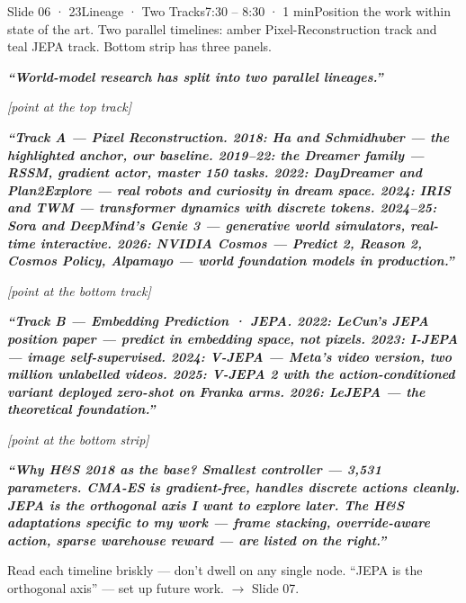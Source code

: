 \documentclass[11pt,a4paper]{article}
\newcommand{\say}[1]{%
    \par\vspace{0.3em}%
    \begingroup
    \leftskip=12pt
    \rightskip=8pt
    \color{thStrong}%
    \itshape\textbf{“#1”}%
    \par
    \endgroup
    \vspace{0.2em}
}
\newcommand{\stage}[1]{%
    \par\textcolor{thMuted}{\small\textit{[#1]}}\par
    \vspace{0.2em}
}
\newcommand{\emphw}[1]{\textbf{\textcolor{thAmber}{#1}}}
\newcommand{\emphteal}[1]{\textbf{\textcolor{thTeal}{#1}}}
\begin{document}
\begin{slide}{Slide 06 · 23}{Lineage · Two Tracks}{7:30 – 8:30 · 1 min}{Position the work within state of the art. Two parallel timelines: amber Pixel-Reconstruction track and teal JEPA track. Bottom strip has three panels.}
\say{World-model research has split into \textbf{two parallel lineages}.}

\stage{point at the top track}

\say{\emphw{Track A — Pixel Reconstruction.} \textbf{2018}: Ha and Schmidhuber — the highlighted anchor, our baseline. \textbf{2019–22}: the Dreamer family — RSSM, gradient actor, master 150 tasks. \textbf{2022}: DayDreamer and Plan2Explore — real robots and curiosity in dream space. \textbf{2024}: IRIS and TWM — transformer dynamics with discrete tokens. \textbf{2024–25}: Sora and DeepMind's Genie 3 — generative world simulators, real-time interactive. \textbf{2026}: NVIDIA Cosmos — Predict 2, Reason 2, Cosmos Policy, Alpamayo — world foundation models in production.}

\stage{point at the bottom track}

\say{\emphteal{Track B — Embedding Prediction · JEPA.} \textbf{2022}: LeCun's JEPA position paper — predict in embedding space, not pixels. \textbf{2023}: I-JEPA — image self-supervised. \textbf{2024}: V-JEPA — Meta's video version, two million unlabelled videos. \textbf{2025}: V-JEPA 2 with the action-conditioned variant deployed zero-shot on Franka arms. \textbf{2026}: LeJEPA — the theoretical foundation.}

\stage{point at the bottom strip}

\say{Why H\&S 2018 as the base? \emphw{Smallest controller} — 3,531 parameters. \emphw{CMA-ES} is gradient-free, handles discrete actions cleanly. \emphteal{JEPA is the orthogonal axis} I want to explore later. The H\&S adaptations specific to my work — frame stacking, override-aware action, sparse warehouse reward — are listed on the right.}

\begin{stagebox}
Read each timeline briskly — don't dwell on any single node. ``JEPA is the orthogonal axis'' — set up future work. $\rightarrow$ Slide 07.
\end{stagebox}
\end{slide}

\end{document}
